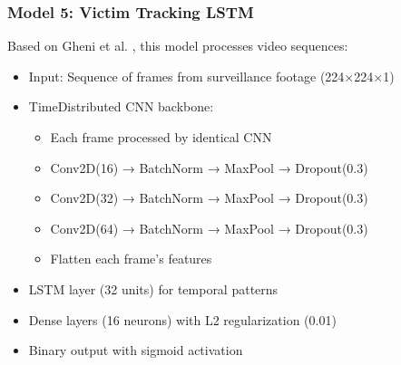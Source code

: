 \documentclass[conference,compsoc]{IEEEtran}
\begin{document}
\subsubsection{Model 5: Victim Tracking LSTM}
Based on Gheni et al. \cite{gheni2024}, this model processes video sequences:
\begin{itemize}
    \item Input: Sequence of frames from surveillance footage (224×224×1)
    \item TimeDistributed CNN backbone:
        \begin{itemize}
            \item Each frame processed by identical CNN
            \item Conv2D(16) → BatchNorm → MaxPool → Dropout(0.3)
            \item Conv2D(32) → BatchNorm → MaxPool → Dropout(0.3)
            \item Conv2D(64) → BatchNorm → MaxPool → Dropout(0.3)
            \item Flatten each frame's features
        \end{itemize}
    \item LSTM layer (32 units) for temporal patterns
    \item Dense layers (16 neurons) with L2 regularization (0.01)
    \item Binary output with sigmoid activation
\end{itemize}
\end{document}
